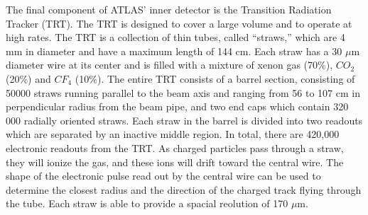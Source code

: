 The final component of ATLAS' inner detector is the Transition Radiation Tracker (TRT).
The TRT is designed to cover a large volume and to operate at high rates.
The TRT is a collection of thin tubes, called ``straws,'' which are 4 mm in diameter and have a maximum length of 144 cm.
Each straw has a 30 $\mu$m diameter wire at its center and is filled with a mixture of xenon gas (70\%), $CO_2$ (20\%) and $CF_{4}$ (10\%).
The entire TRT consists of a barrel section, consisting of 50000 straws running parallel to the beam axis and ranging from 56 to 107 cm in perpendicular radius from the beam pipe, and two end caps which contain 320 000 radially oriented straws.
Each straw in the barrel is divided into two readouts which are separated by an inactive middle region.
In total, there are 420,000 electronic readouts from the TRT.
As charged particles pass through a straw, they will ionize the gas, and these ions will drift toward the central wire.
The shape of the electronic pulse read out by the central wire can be used to determine the closest radius and the direction of the charged track flying through the tube.
Each straw is able to provide a spacial reolution of 170 $\mu$m.



